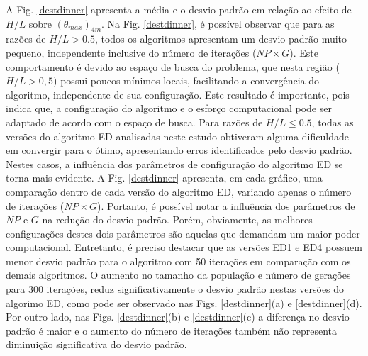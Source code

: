 \documentclass[12pt,A4,A4pt]{article}
\begin{document}
A Fig. \ref{destdinner} apresenta a média e o desvio padrão em relação ao efeito de $H/L$ sobre $({\theta}_{max})_{4m}$. Na Fig. \ref{destdinner}, é possível observar que para as razões de $H/L>0.5$, todos os algoritmos apresentam um desvio padrão muito pequeno, independente inclusive do número de iterações ($NP \times G$). Este comportamento é devido ao espaço de busca do problema, que nesta região ($H/L>0,5$) possui poucos mínimos locais, facilitando a convergência do algoritmo, independente de sua configuração. Este resultado é importante, pois indica que, a configuração do algoritmo e o esforço computacional pode ser adaptado de acordo com o espaço de busca. 
Para razões de $H/L\leqslant0.5$, todas as versões do algoritmo ED analisadas neste estudo obtiveram alguma dificuldade em convergir para o ótimo, apresentando erros identificados pelo desvio padrão. Nestes casos, a influência dos parâmetros de configuração do algoritmo ED se torna mais evidente. A Fig. \ref{destdinner} apresenta, em cada gráfico, uma comparação dentro de cada versão do algoritmo ED, variando apenas o número de iterações ($NP \times G$). Portanto, é possível notar a influência dos parâmetros de $NP$ e $G$ na redução do desvio padrão. Porém, obviamente, as melhores configurações destes dois parâmetros são aquelas que demandam um maior poder computacional. Entretanto, é preciso destacar que as versões ED1 e ED4 possuem menor desvio padrão para o algoritmo com 50 iterações em comparação com os demais algoritmos. O aumento no tamanho da população e número de gerações para 300 iterações, reduz significativamente o desvio padrão nestas versões do algorimo ED, como pode ser observado nas Figs. \ref{destdinner}(a) e \ref{destdinner}(d). Por outro lado, nas Figs. \ref{destdinner}(b) e \ref{destdinner}(c) a diferença no desvio padrão é maior e o aumento do número de iterações também não representa diminuição significativa do desvio padrão.
\end{document}
